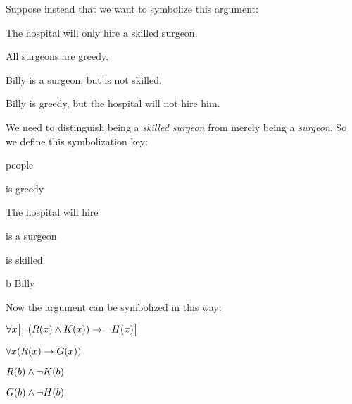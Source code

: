 Suppose instead that we want to symbolize this argument:
\begin{earg}
\item The hospital will only hire a skilled surgeon. 
\item All surgeons are greedy. 
\item Billy is a surgeon, but is not skilled. 
\item[\texttherefore] Billy is greedy, but the hospital will not hire him.
\end{earg}
We need to distinguish being a \emph{skilled surgeon} from merely being a \emph{surgeon}. So we define this symbolization key:
\begin{ekey}
\item[\text{domain}] people
\item[\atom{G}{x}]  is greedy
\item[\atom{H}{x}] The hospital will hire 
\item[\atom{R}{x}]  is a surgeon
\item[\atom{K}{x}]  is skilled
\item[b] Billy
\end{ekey}

Now the argument can be symbolized in this way:
\begin{earg}
\label{surgeon2}
\item[] $\forall x\bigl[\neg (R(x) \wedge K(x)) \rightarrow \neg H(x)\bigr]$
\item[] $\forall x(R(x) \rightarrow G(x))$
\item[] $R(b) \wedge \neg K(b)$
\item[\texttherefore] $G(b) \wedge \neg H(b)$
\end{earg}

